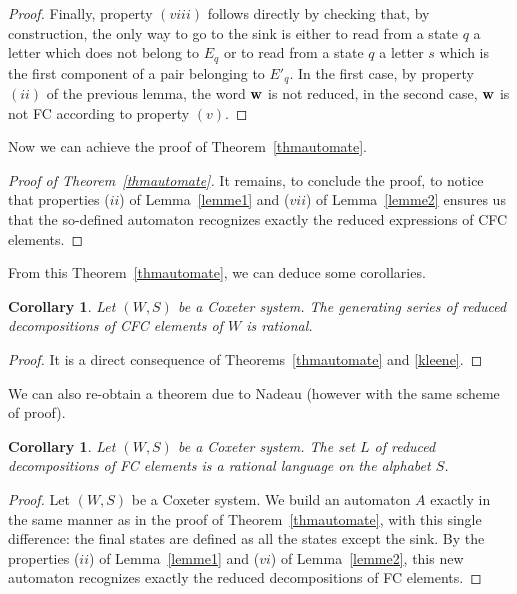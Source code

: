 \documentclass[reqno,12pt]{amsart}
\newtheorem{corollary}[Theorem]{Corollary}
\theoremstyle{definition}
\begin{document}
\begin{proof}
\medskip
 
Finally, property $(viii)$ follows directly by checking that, by construction, the only way to go to the sink is either to read from a state $q$ a letter which does  not belong to  $E_q$ or to read from a state $q$ a letter $s$ which is the first component of a pair belonging to  $E'_q$. In the first case, by property $(ii)$ of the previous lemma, the word ${\bf w}$ is not reduced, in the second case, ${\bf w}$ is not FC according to property $(v)$.\end{proof}

Now we can achieve the proof of Theorem~\ref{thmautomate}.

\begin{proof}[Proof of Theorem~\ref{thmautomate}]
It remains, to conclude the proof, to notice that properties ($ii$) of Lemma~\ref{lemme1} and ($vii$) of Lemma~\ref{lemme2} ensures us that the so-defined automaton recognizes exactly the reduced expressions of CFC elements.

\end{proof}
 
 
From this Theorem~\ref{thmautomate}, we can deduce some corollaries.
 
 \begin{corollary}
Let $(W,S)$ be a Coxeter system. The generating series of reduced decompositions of CFC elements of $W$ is rational.
 \end{corollary}

\begin{proof}
It is a direct consequence of Theorems~\ref{thmautomate} and \ref{kleene}.
\end{proof}

We can also re-obtain a theorem due to Nadeau (however with the same scheme of proof).

\begin{corollary}
Let $(W,S)$ be a Coxeter system. The set $L$ of reduced decompositions of FC elements is a rational language on the alphabet $S$.
\end{corollary}

\begin{proof}
Let $(W,S)$ be a Coxeter system. We build an automaton  $A$ exactly in the same manner as in the proof of  Theorem~\ref{thmautomate}, with this single difference: the final states are defined as all the states except the sink. By the properties ($ii$)  of Lemma~\ref{lemme1} and ($vi$) of Lemma~\ref{lemme2}, this new automaton recognizes exactly the reduced decompositions of FC elements.
\end{proof}
\end{document}
